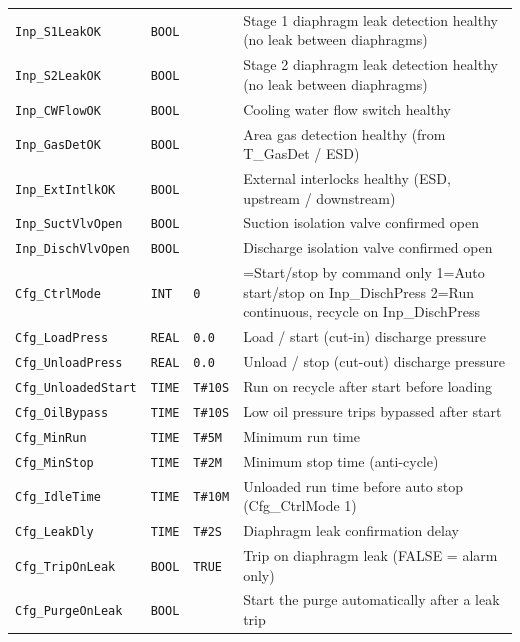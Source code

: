{\begin{longtable}{@{}>{\raggedright\arraybackslash}p{3.4cm}>{\raggedright\arraybackslash}p{3.3cm}>{\raggedright\arraybackslash}p{1.3cm}>{\raggedright\arraybackslash}p{6.4cm}@{}}
\texttt{Inp\_S1LeakOK} & \texttt{BOOL} &  & Stage 1 diaphragm leak detection healthy (no leak between diaphragms) \\
\texttt{Inp\_S2LeakOK} & \texttt{BOOL} &  & Stage 2 diaphragm leak detection healthy (no leak between diaphragms) \\
\texttt{Inp\_CWFlowOK} & \texttt{BOOL} &  & Cooling water flow switch healthy \\
\texttt{Inp\_GasDetOK} & \texttt{BOOL} &  & Area gas detection healthy (from T\_GasDet /\allowbreak{} ESD) \\
\texttt{Inp\_ExtIntlkOK} & \texttt{BOOL} &  & External interlocks healthy (ESD, upstream /\allowbreak{} downstream) \\
\texttt{Inp\_SuctVlvOpen} & \texttt{BOOL} &  & Suction isolation valve confirmed open \\
\texttt{Inp\_DischVlvOpen} & \texttt{BOOL} &  & Discharge isolation valve confirmed open \\
\texttt{Cfg\_CtrlMode} & \texttt{INT} & \texttt{0} & 0=Start/\allowbreak{}stop by command only 1=Auto start/\allowbreak{}stop on Inp\_DischPress 2=Run continuous, recycle on Inp\_DischPress \\
\texttt{Cfg\_LoadPress} & \texttt{REAL} & \texttt{0.0} & Load /\allowbreak{} start (cut-in) discharge pressure \\
\texttt{Cfg\_UnloadPress} & \texttt{REAL} & \texttt{0.0} & Unload /\allowbreak{} stop (cut-out) discharge pressure \\
\texttt{Cfg\_UnloadedStart} & \texttt{TIME} & \texttt{T\#10S} & Run on recycle after start before loading \\
\texttt{Cfg\_OilBypass} & \texttt{TIME} & \texttt{T\#10S} & Low oil pressure trips bypassed after start \\
\texttt{Cfg\_MinRun} & \texttt{TIME} & \texttt{T\#5M} & Minimum run time \\
\texttt{Cfg\_MinStop} & \texttt{TIME} & \texttt{T\#2M} & Minimum stop time (anti-cycle) \\
\texttt{Cfg\_IdleTime} & \texttt{TIME} & \texttt{T\#10M} & Unloaded run time before auto stop (Cfg\_CtrlMode 1) \\
\texttt{Cfg\_LeakDly} & \texttt{TIME} & \texttt{T\#2S} & Diaphragm leak confirmation delay \\
\texttt{Cfg\_TripOnLeak} & \texttt{BOOL} & \texttt{TRUE} & Trip on diaphragm leak (FALSE = alarm only) \\
\texttt{Cfg\_PurgeOnLeak} & \texttt{BOOL} &  & Start the purge automatically after a leak trip \\

\end{longtable}}
